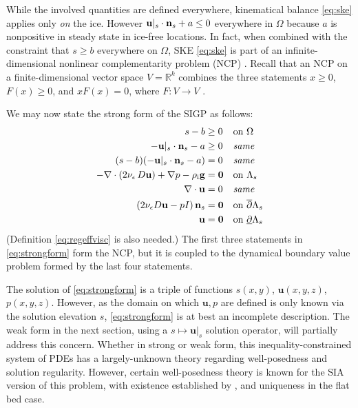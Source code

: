 \documentclass[letterpaper,final,12pt,reqno]{amsart}
\theoremstyle{claim}
\newcommand{\eps}{\epsilon}
\newcommand{\RR}{\mathbb{R}}
\newcommand{\bn}{\mathbf{n}}
\newcommand{\bu}{\mathbf{u}}
\newcommand{\bzero}{\bm{0}}
\newcommand{\rhoi}{\rho_{\text{i}}}
\numberwithin{equation}{section}
\numberwithin{figure}{section}
\numberwithin{table}{section}
\numberwithin{theorem}{section}
\begin{document}
While the involved quantities are defined everywhere, kinematical balance \eqref{eq:ske} applies only \emph{on} the ice.  However $\bus \cdot \bn_s + a \le 0$ everywhere in $\Omega$ because $a$ is nonpositive in steady state in ice-free locations.  In fact, when combined with the constraint that $s\ge b$ everywhere on $\Omega$, SKE \eqref{eq:ske} is part of an infinite-dimensional nonlinear complementarity problem (NCP) \cite{Bueler2021conservation}.  Recall that an NCP on a finite-dimensional vector space $V=\RR^k$ combines the three statements $x\ge 0$, $F(x)\ge 0$, and $x F(x)=0$, where $F:V\to V$ \cite{FacchineiPang2003}.

We may now state the strong form of the SIGP as follows:
\begin{align}
s - b &\ge 0 && \text{on $\Omega$} \label{eq:strongform} \\
- \bu|_s \cdot \bn_s - a &\ge 0 && \text{\emph{same}} \notag \\
(s - b) (- \bu|_s \cdot \bn_s - a) &= 0 && \text{\emph{same}} \notag \\
- \nabla \cdot \left(2 \nu_\eps\, D\bu\right) + \nabla p - \rhoi \mathbf{g} &= \bzero && \text{on $\Lambda_s$} \notag \\
\nabla \cdot \bu &= 0 && \text{\emph{same}} \notag \\
\left(2 \nu_\eps D\bu - pI\right) \bn_s &= \bzero && \text{on $\overline{\partial} \Lambda_s$} \notag \\
\bu &= \bzero && \text{on $\underline{\partial} \Lambda_s$} \notag
\end{align}
(Definition \eqref{eq:regeffvisc} is also needed.)  The first three statements in \eqref{eq:strongform} form the NCP, but it is coupled to the dynamical boundary value problem formed by the last four statements.

The solution of \eqref{eq:strongform} is a triple of functions $s(x,y)$, $\bu(x,y,z)$, $p(x,y,z)$.  However, as the domain on which $\bu,p$ are defined is only known via the solution elevation $s$, \eqref{eq:strongform} is at best an incomplete description.  The weak form in the next section, using a $s\mapsto \bu|_s$ solution operator, will partially address this concern.  Whether in strong or weak form, this inequality-constrained system of PDEs has a largely-unknown theory regarding well-posedness and solution regularity.  However, certain well-posedness theory is known for the SIA version of this problem, with existence established by \cite{JouvetBueler2012}, and uniqueness in the flat bed case.
\end{document}
